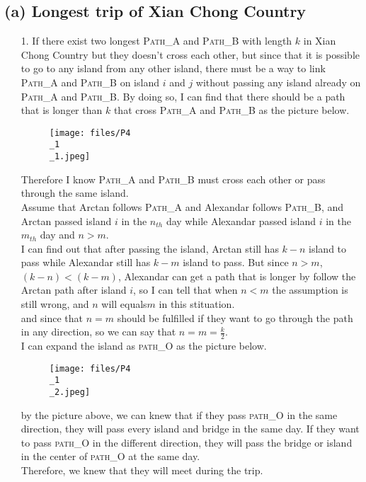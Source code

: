 \documentclass{homework}
\begin{document}
\subsection*{(a) Longest trip of Xian Chong Country}
\begin{itemize}
    \item[1.]
        If there exist two longest \textsc{Path\_A} and \textsc{Path\_B} with length $k$ in Xian Chong Country but they doesn't cross each other, but since that it is possible to go to any island from any other island, there must be a way to link \textsc{Path\_A} and \textsc{Path\_B} on island $i$ and $j$ without passing any island already on \textsc{Path\_A} and \textsc{Path\_B}. By doing so, I can find that there should be a path that is longer than $k$ that cross \textsc{Path\_A} and \textsc{Path\_B} as the picture below.
        \begin{figure}[H]
            \centering
            \texttt{[image: files/P4\\\_1\\\_1.jpeg]}
        \end{figure}
        Therefore I know \textsc{Path\_A} and \textsc{Path\_B} must cross each other or pass through the same island.\\
        Assume that Arctan follows \textsc{Path\_A} and Alexandar follows \textsc{Path\_B}, and Arctan passed island $i$ in the $n_{th}$ day while Alexandar passed island $i$ in the $m_{th}$ day and $n > m$.\\
        I can find out that after passing the island, Arctan still has $k-n$ island to pass while Alexandar still has $k-m$ island to pass. But since $n > m$, $(k-n) < (k-m)$, Alexandar can get a path that is longer by follow the Arctan path after island $i$, so I can tell that when $n < m$ the assumption is still wrong, and $n$ will equals$m$ in this stituation.\\
        and since that  $n = m$ should be fulfilled if they want to go through the path in any direction, so we can say that $n = m = \frac{k}{2}$.\\
        I can expand the island as \textsc{path\_O} as the picture below.
        \begin{figure}[H]
            \centering
            \texttt{[image: files/P4\\\_1\\\_2.jpeg]}
        \end{figure}
        by the picture above, we can knew that if they pass \textsc{path\_O} in the same direction, they will pass every island and bridge in the same day. If they want to pass \textsc{path\_O} in the different direction, they will pass the bridge or island in the center of \textsc{path\_O} at the same day.\\
        Therefore, we knew that they will meet during the trip.
\clearpage


\end{itemize}
\end{document}
